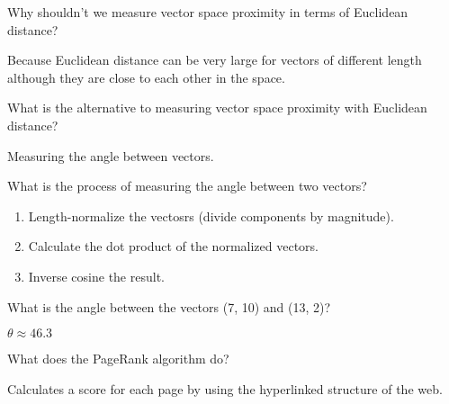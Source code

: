 \documentclass[2by4,grid]{flashcards}
\begin{document}
\begin{flashcard}{Why shouldn't we measure vector space proximity in terms of Euclidean distance?}
	\begin{center}
        Because Euclidean distance can be very large for vectors of different length although they are close to each other in the space.
	\end{center}
\end{flashcard}

\begin{flashcard}{What is the alternative to measuring vector space proximity with Euclidean distance?}
	\begin{center}
        Measuring the angle between vectors.
	\end{center}
\end{flashcard}

\begin{flashcard}{What is the process of measuring the angle between two vectors?}
	\begin{center}
        \begin{enumerate}
            \item Length-normalize the vectosrs (divide components by magnitude).
            \item Calculate the dot product of the normalized vectors.
            \item Inverse cosine the result.
        \end{enumerate}
	\end{center}
\end{flashcard}

\begin{flashcard}{What is the angle between the vectors (7, 10) and (13, 2)?}
	\begin{center}
        $\theta \approx 46.3$
	\end{center}
\end{flashcard}

\begin{flashcard}{What does the PageRank algorithm do?}
	\begin{center}
        Calculates a score for each page by using the hyperlinked structure of the web.
	\end{center}
\end{flashcard}
\end{document}
